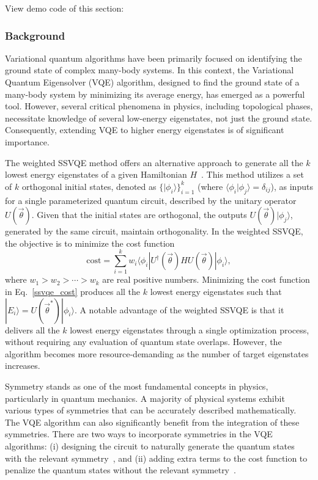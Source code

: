 View demo code of this section: 

\subsubsection{Background}
Variational quantum algorithms have been primarily focused on identifying the ground state of complex many-body systems. In this context, the Variational Quantum Eigensolver (VQE) algorithm, designed to find the ground state of a many-body system  by minimizing its average energy, has emerged as a powerful tool. However, several critical phenomena in physics, including topological phases, necessitate knowledge of several low-energy eigenstates, not just the ground state. Consequently, extending VQE to higher energy eigenstates is of significant importance.

The weighted SSVQE method offers an alternative approach to generate all the $k$ lowest energy eigenstates of a given Hamiltonian $H$~\cite{nakanishi2019subspace}. This method utilizes a set of $k$ orthogonal initial states, denoted as $\{|\phi_{i}\rangle\}_{i=1}^{k}$ (where $\langle \phi_{i} | \phi_{j} \rangle = \delta_{ij}$), as inputs for a single parameterized quantum circuit, described by the unitary operator $U(\vec{\theta})$. Given that the initial states are orthogonal, the outputs $U(\vec{\theta})| \phi_{j} \rangle$, generated by the same circuit, maintain orthogonality. In the weighted SSVQE, the objective is to minimize the cost function
\begin{equation}
    \mathrm{cost} = \sum_{i=1}^{k} w_{i} \langle \phi_{i}| U^{\dagger}(\vec{\theta}) H U(\vec{\theta}) | \phi_{i} \rangle,
    \label{ssvqe_cost}
\end{equation}
where $w_1 > w_2 > \cdots > w_k$ are real positive numbers. Minimizing the cost function in Eq.~\eqref{ssvqe_cost} produces all the $k$ lowest energy eigenstates such that $|E_{i}\rangle = U(\vec{\theta}^{*})|\phi_{i}\rangle$.
A notable advantage of the weighted SSVQE is that it delivers all the $k$ lowest energy eigenstates through a single optimization process, without requiring any evaluation of quantum state overlaps. However, the algorithm becomes more resource-demanding as the number of target eigenstates increases.

Symmetry stands as one of the most fundamental concepts in physics, particularly in quantum mechanics. A majority of physical systems exhibit various types of symmetries that can be accurately described mathematically. The VQE algorithm can also significantly benefit from the integration of these symmetries. There are two ways to incorporate symmetries in the VQE algorithms: (i) designing the circuit to naturally generate the quantum states with the relevant symmetry~\cite{Lyu2020accelerated,Gard2020,barron2021preserving}, and (ii) adding extra terms to the cost function to penalize the quantum states without the relevant symmetry~\cite{mcclean2016theory,ryabinkin2018constrained}.

